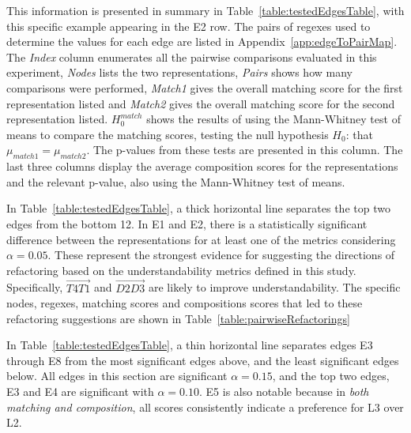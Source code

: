 This information is presented in summary in Table~\ref{table:testedEdgesTable}, with this specific example appearing in the E2 row. The pairs of regexes used to determine the values for each edge are listed in Appendix~\ref{app:edgeToPairMap}.  The \emph{Index} column enumerates all the pairwise comparisons evaluated in this experiment, \emph{Nodes} lists the two representations, \emph{Pairs} shows how many comparisons were performed, \emph{Match1} gives the overall matching score for the first representation listed and \emph{Match2} gives the overall matching score for the second representation listed. $H_0^{match}$ shows the results of using the Mann-Whitney test of means to compare the matching scores, testing the null hypothesis $H_0$: that $\mu_{match1} = \mu_{match2}$.  The p-values from these tests are presented in this column. The last three columns display the average composition scores for the representations and the relevant p-value, also using the Mann-Whitney test of means.



In Table~\ref{table:testedEdgesTable}, a thick horizontal line separates the top two edges from the bottom 12. In E1 and E2, there is a statistically significant difference between the representations for at least one of the metrics considering $\alpha = 0.05$.  These represent the strongest evidence for suggesting the directions of refactoring based on the understandability metrics defined in this study. Specifically, $\overrightarrow{T4 T1}$ and $\overrightarrow{D2 D3}$ are likely to improve understandability.  The specific nodes, regexes, matching scores and compositions scores that led to these refactoring suggestions are shown in Table~\ref{table:pairwiseRefactorings}



In Table~\ref{table:testedEdgesTable}, a thin horizontal line separates edges E3 through E8 from the most significant edges above, and the least significant edges below.  All edges in this section are significant $\alpha = 0.15$, and the top two edges, E3 and E4 are significant with $\alpha = 0.10$. E5 is also notable because in \emph{both matching and composition}, all scores consistently indicate a preference for L3 over L2.



